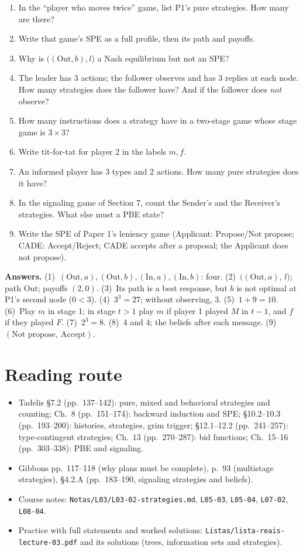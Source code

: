 \documentclass[11pt,a4paper]{article}
\begin{document}
\begin{enumerate}
\item In the ``player who moves twice'' game, list P1's pure strategies. How many are there?
\item Write that game's SPE as a full profile, then its path and payoffs.
\item Why is $\big((\text{Out},b),l\big)$ a Nash equilibrium but not an SPE?
\item The leader has 3 actions; the follower observes and has 3 replies at each node. How many
strategies does the follower have? And if the follower does \emph{not} observe?
\item How many instructions does a strategy have in a two-stage game whose stage game is $3\times3$?
\item Write tit-for-tat for player 2 in the labels $m,f$.
\item An informed player has 3 types and 2 actions. How many pure strategies does it have?
\item In the signaling game of Section 7, count the Sender's and the Receiver's strategies. What
else must a PBE state?
\item Write the SPE of Paper 1's leniency game (Applicant: Propose/Not propose; CADE: Accept/Reject;
CADE accepts after a proposal; the Applicant does not propose).
\end{enumerate}

\noindent\textbf{Answers.}
(1)~$(\text{Out},a),(\text{Out},b),(\text{In},a),(\text{In},b)$: four.
(2)~$\big((\text{Out},a),\,l\big)$; path Out; payoffs $(2,0)$.
(3)~Its path is a best response, but $b$ is not optimal at P1's second node ($0<3$).
(4)~$3^3=27$; without observing, 3.
(5)~$1+9=10$.
(6)~Play $m$ in stage 1; in stage $t>1$ play $m$ if player 1 played $M$ in $t-1$, and $f$ if they
played $F$.
(7)~$2^3=8$.
(8)~4 and 4; the beliefs after each message.
(9)~$(\text{Not propose},\ \text{Accept})$.

\section{Reading route}
\small
\begin{itemize}
\item Tadelis §7.2 (pp.~137--142): pure, mixed and behavioral strategies and counting; Ch.~8
(pp.~151--174): backward induction and SPE; §10.2--10.3 (pp.~193--200): histories, strategies,
grim trigger; §12.1--12.2 (pp.~241--257): type-contingent strategies; Ch.~13 (pp.~270--287): bid
functions; Ch.~15--16 (pp.~303--338): PBE and signaling.
\item Gibbons pp.~117--118 (why plans must be complete), p.~93 (multistage strategies), §4.2.A
(pp.~183--190, signaling strategies and beliefs).
\item Course notes: \texttt{Notas/L03/L03-02-strategies.md}, \texttt{L05-03}, \texttt{L05-04},
\texttt{L07-02}, \texttt{L08-04}.
\item Practice with full statements and worked solutions:
\texttt{Listas/lista-reais-lecture-03.pdf} and its solutions (trees, information sets and
strategies).
\end{itemize}
\end{document}

